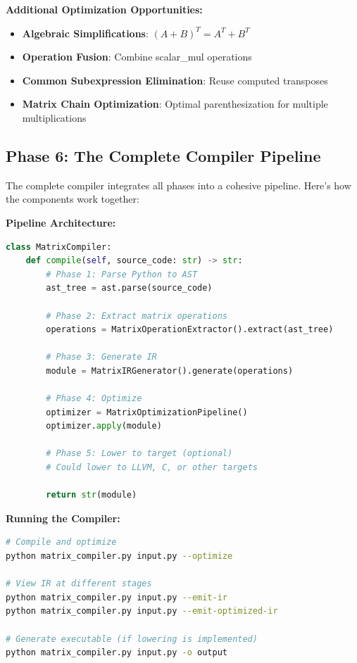 \documentclass[11pt,a4paper]{article}
\begin{document}
\textbf{Additional Optimization Opportunities:}
\begin{itemize}
    \item \textbf{Algebraic Simplifications}: $(A+B)^T = A^T + B^T$
    \item \textbf{Operation Fusion}: Combine scalar\_mul operations
    \item \textbf{Common Subexpression Elimination}: Reuse computed transposes
    \item \textbf{Matrix Chain Optimization}: Optimal parenthesization for multiple multiplications
\end{itemize}

\subsection{Phase 6: The Complete Compiler Pipeline}

The complete compiler integrates all phases into a cohesive pipeline. Here's how the components work together:

\textbf{Pipeline Architecture:}
\begin{lstlisting}[language=Python, caption=Main compiler driver structure]
class MatrixCompiler:
    def compile(self, source_code: str) -> str:
        # Phase 1: Parse Python to AST
        ast_tree = ast.parse(source_code)

        # Phase 2: Extract matrix operations
        operations = MatrixOperationExtractor().extract(ast_tree)

        # Phase 3: Generate IR
        module = MatrixIRGenerator().generate(operations)

        # Phase 4: Optimize
        optimizer = MatrixOptimizationPipeline()
        optimizer.apply(module)

        # Phase 5: Lower to target (optional)
        # Could lower to LLVM, C, or other targets

        return str(module)
\end{lstlisting}

\textbf{Running the Compiler:}
\begin{lstlisting}[language=bash, caption=Command-line usage]
# Compile and optimize
python matrix_compiler.py input.py --optimize

# View IR at different stages
python matrix_compiler.py input.py --emit-ir
python matrix_compiler.py input.py --emit-optimized-ir

# Generate executable (if lowering is implemented)
python matrix_compiler.py input.py -o output
\end{lstlisting}
\end{document}
